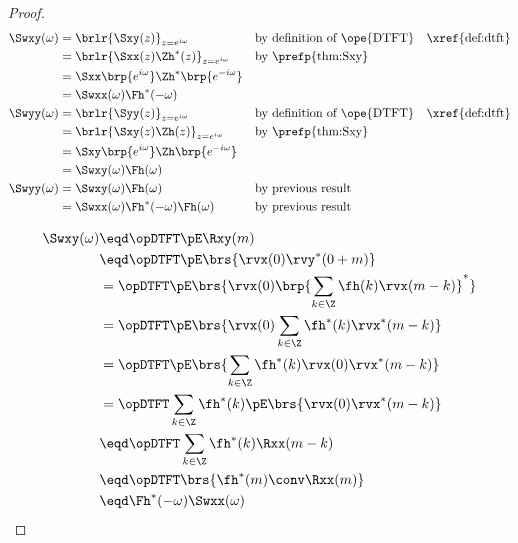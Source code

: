 \begin{proof}
\begin{align*}
   \Swxy(\omega)
     &= \brlr{\Sxy(z)}_{z=e^{i\omega}}
     && \text{by definition of \ope{DTFT}}
     && \text{\xref{def:dtft}}
   \\&= \brlr{\Sxx(z)\Zh^\ast(z)}_{z=e^{i\omega}}
     && \text{by \prefp{thm:Sxy}}
   \\&= \Sxx\brp{e^{i\omega}}\Zh^\ast\brp{e^{-i\omega}}
   \\&= \Swxx(\omega) \Fh^\ast(-\omega)
   \\
   \Swyy(\omega)
     &= \brlr{\Syy(z)}_{z=e^{i\omega}}
     && \text{by definition of \ope{DTFT}}
     && \text{\xref{def:dtft}}
   \\&= \brlr{\Sxy(z)\Zh(z)}_{z=e^{i\omega}}
     && \text{by \prefp{thm:Sxy}}
   \\&= \Sxy\brp{e^{i\omega}}\Zh\brp{e^{-i\omega}}
   \\&= \Swxy(\omega) \Fh(\omega)
   \\
   \Swyy(\omega)
     &= \Swxy(\omega) \Fh(\omega)
     && \text{by previous result}
   \\&= \Swxx(\omega) \Fh^\ast(-\omega) \Fh(\omega)
     && \text{by previous result}
\end{align*}

\begin{align*}
  \Swxy(\omega)
    &\eqd \opDTFT\pE\Rxy(m)
  \\&\eqd \opDTFT\pE\brs{\rvx(0)\rvy^\ast(0+m)}
  \\&=    \opDTFT\pE\brs{\rvx(0)\brp{\sum_{k\in\Z} \fh(k)           \rvx(m-k)}^\ast}
  \\&=    \opDTFT\pE\brs{\rvx(0)     \sum_{k\in\Z} \fh^\ast(k)      \rvx^\ast(m-k)}
  \\&=    \opDTFT\pE\brs{            \sum_{k\in\Z} \fh^\ast(k)      \rvx(0)\rvx^\ast(m-k)}
  \\&=    \opDTFT                    \sum_{k\in\Z} \fh^\ast(k) \pE\brs{\rvx(0)\rvx^\ast(m-k)}
  \\&\eqd \opDTFT                    \sum_{k\in\Z} \fh^\ast(k) \Rxx(m-k)
  \\&\eqd \opDTFT                             \brs{\fh^\ast(m) \conv \Rxx(m)}
  \\&\eqd \Fh^\ast(-\omega) \Swxx(\omega)
\end{align*}


\end{proof}
